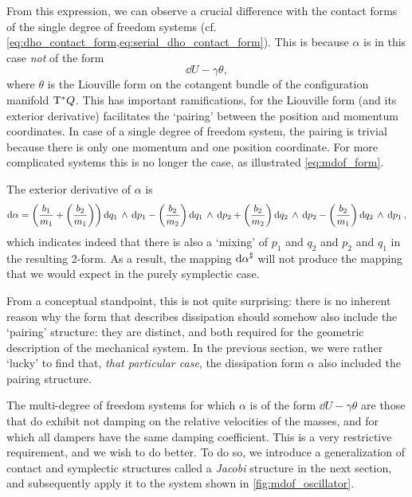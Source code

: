 From this expression, we can observe a crucial difference with the contact forms of the single degree of freedom systems (cf. \cref{eq:dho_contact_form,eq:serial_dho_contact_form}). This is because $\alpha$ is in this case \emph{not} of the form
$$ \dd{U} - \gamma \theta, $$
where $\theta$ is the Liouville form on the cotangent bundle of the configuration manifold $\mathrm{T}^*Q$. This has important ramifications, for the Liouville form (and its exterior derivative) facilitates the `pairing' between the position and momentum coordinates. In case of a single degree of freedom system, the pairing is trivial because there is only one momentum and one position coordinate. For more complicated systems this is no longer the case, as illustrated \cref{eq:mdof_form}.

The exterior derivative of $\alpha$ is
$$
    \dd{\alpha} = \qty(\frac{b_1}{m_1} + \qty(\frac{b_2}{m_1}))  \dd{q_1}\,\wedge\,\dd{p_1} 
                  -\qty(\frac{b_2}{m_2}) \dd{q_1}\,\wedge\,\dd{p_2} 
                  + \qty(\frac{b_2}{m_2}) \dd{q_2}\,\wedge\,\dd{p_2} 
                  - \qty(\frac{b_2}{m_1}) \dd{q_2}\,\wedge\,\dd{p_1} ,
$$
which indicates indeed that there is also a `mixing' of $p_1$ and $q_2$ and $p_2$ and $q_1$ in the resulting 2-form. As a result, the mapping $ \dd{\alpha}^\sharp $ will not produce the mapping that we would expect in the purely symplectic case.

From a conceptual standpoint, this is not quite surprising: there is no inherent reason why the form that describes dissipation should somehow also include the `pairing' structure: they are distinct, and both required for the geometric description of the mechanical system. In the previous section, we were rather `lucky' to find that, \emph{that particular case}, the dissipation form $\alpha$ also included the pairing structure. 

The multi-degree of freedom systems for which $ \alpha $ is of the form $\dd{U} - \gamma \theta$ are those that do exhibit not damping on the relative velocities of the masses, and for which all dampers have the same damping coefficient. This is a very restrictive requirement, and we wish to do better. To do so, we introduce a generalization of contact and symplectic structures called a \emph{Jacobi} structure in the next section, and subsequently apply it to the system shown in \cref{fig:mdof_oscillator}.

